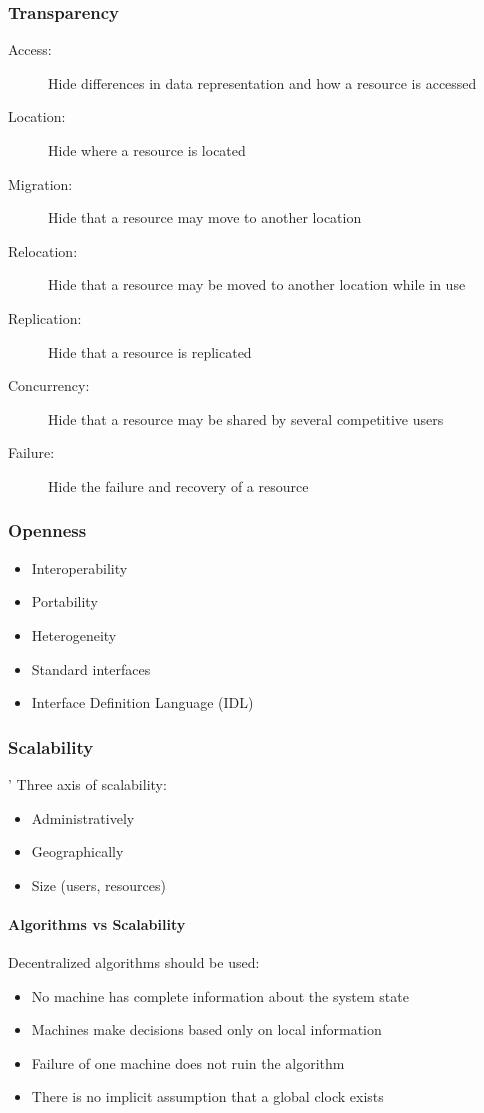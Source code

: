 \subsubsection{Transparency}
\begin{description}
	\item[Access:] Hide differences in data representation and how a resource is accessed
	\item[Location:] Hide where a resource is located
	\item[Migration:] Hide that a resource may move to another location
	\item[Relocation:] Hide that a resource may be moved to another location while in use
	\item[Replication:] Hide that a resource is replicated
	\item[Concurrency:] Hide that a resource may be shared by several competitive users
	\item[Failure:] Hide the failure and recovery of a resource
\end{description}

\subsubsection{Openness}
\begin{itemize}
	\item Interoperability
	\item Portability
	\item Heterogeneity
	\item Standard interfaces
	\item Interface Definition Language (IDL)
\end{itemize}

\subsubsection{Scalability}'
Three axis of scalability:
\begin{itemize}
	\item Administratively
	\item Geographically
	\item Size (users, resources)
\end{itemize}

\paragraph{Algorithms vs Scalability}
Decentralized algorithms should be used:
\begin{itemize}
	\item No machine has complete information about the system state
	\item Machines make decisions based only on local information
	\item Failure of one machine does not ruin the algorithm
	\item There is no implicit assumption that a global clock exists
\end{itemize}

